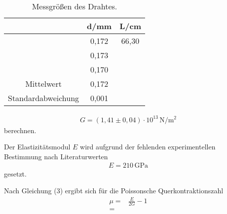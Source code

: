 \begin{table}
\centering
\caption{Messgrößen des Drahtes.}
\label{tab:ohnebfeld}
\begin{tabular}{c c c}
\toprule
 & d\:/\:mm & L\:/\:cm\\
\midrule
 & 0,172 & 66,30 \\
 & 0,173 &  \\
 & 0,170 & \\
\hline
Mittelwert & 0,172 & \\
Standardabweichung & 0,001 & \\
\bottomrule
\end{tabular}
\end{table}

\begin{align*}
G = (1,41 \pm 0,04) \cdot 10^{13}\,\si{\newton\per\meter\squared}
\end{align*}
berechnen.

Der Elastizitätsmodul $E$ wird aufgrund der fehlenden experimentellen Bestimmung nach Literaturwerten
\begin{align*}
E = 210\,\si{\giga\pascal}
\end{align*}
gesetzt.

Nach Gleichung (3) ergibt sich für die Poissonsche Querkontraktionszahl
\begin{align*}
\mu = {} & \frac{E}{2G} - 1 \\
    = {} & 
\end{align*}
